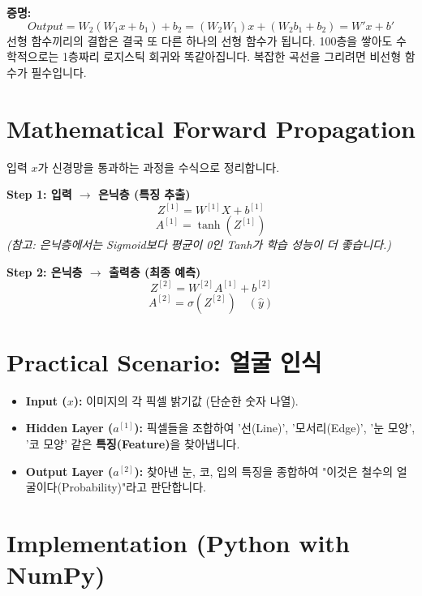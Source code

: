 \documentclass[11pt,a4paper]{book}
\theoremstyle{definition}
\begin{document}
\textbf{증명:}
$$ Output = W_2(W_1 x + b_1) + b_2 = (W_2 W_1)x + (W_2 b_1 + b_2) = W'x + b' $$
선형 함수끼리의 결합은 결국 또 다른 하나의 선형 함수가 됩니다. 100층을 쌓아도 수학적으로는 1층짜리 로지스틱 회귀와 똑같아집니다. 복잡한 곡선을 그리려면 비선형 함수가 필수입니다.


\section{Mathematical Forward Propagation}

입력 $x$가 신경망을 통과하는 과정을 수식으로 정리합니다.

\textbf{Step 1: 입력 $\to$ 은닉층 (특징 추출)}
$$ Z^{[1]} = W^{[1]}X + b^{[1]} $$
$$ A^{[1]} = \tanh(Z^{[1]}) $$
\textit{(참고: 은닉층에서는 Sigmoid보다 평균이 0인 Tanh가 학습 성능이 더 좋습니다.)}

\textbf{Step 2: 은닉층 $\to$ 출력층 (최종 예측)}
$$ Z^{[2]} = W^{[2]}A^{[1]} + b^{[2]} $$
$$ A^{[2]} = \sigma(Z^{[2]}) \quad (\hat{y}) $$

\section{Practical Scenario: 얼굴 인식}

\begin{examplebox}[title={얼굴 인식 AI의 사고 과정}]
\begin{itemize}
    \item \textbf{Input ($x$):} 이미지의 각 픽셀 밝기값 (단순한 숫자 나열).
    \item \textbf{Hidden Layer ($a^{[1]}$):} 픽셀들을 조합하여 '선(Line)', '모서리(Edge)', '눈 모양', '코 모양' 같은 \textbf{특징(Feature)}을 찾아냅니다.
    \item \textbf{Output Layer ($a^{[2]}$):} 찾아낸 눈, 코, 입의 특징을 종합하여 "이것은 철수의 얼굴이다(Probability)"라고 판단합니다.
\end{itemize}
\end{examplebox}

\section{Implementation (Python with NumPy)}
\end{document}

